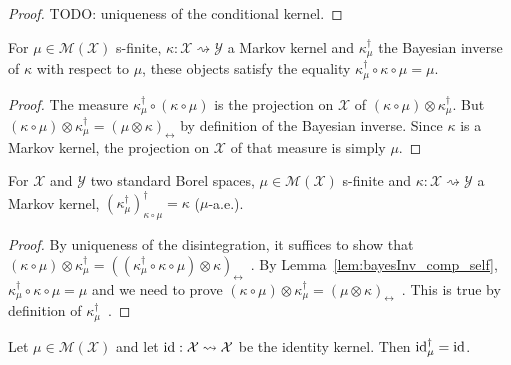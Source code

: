 \begin{proof}\leanok
\uses{}
TODO: uniqueness of the conditional kernel.
\end{proof}


\begin{lemma}
  \label{lem:bayesInv_comp_self}
  \leanok
  For $\mu \in \mathcal M(\mathcal X)$ s-finite, $\kappa : \mathcal X \rightsquigarrow \mathcal Y$ a Markov kernel and $\kappa_\mu^\dagger$ the Bayesian inverse of $\kappa$ with respect to $\mu$, these objects satisfy the equality $\kappa_\mu^\dagger \circ \kappa \circ \mu = \mu$.
\end{lemma}

\begin{proof}\leanok
\uses{}
The measure $\kappa_\mu^\dagger \circ (\kappa \circ \mu)$ is the projection on $\mathcal X$ of $(\kappa \circ \mu) \otimes \kappa_\mu^\dagger$. But $(\kappa \circ \mu) \otimes \kappa_\mu^\dagger = (\mu \otimes \kappa)_\leftrightarrow$ by definition of the Bayesian inverse. Since $\kappa$ is a Markov kernel, the projection on $\mathcal X$ of that measure is simply $\mu$.
\end{proof}


\begin{lemma}
  \label{lem:bayesInv_self}
  \leanok
  For $\mathcal X$ and $\mathcal Y$ two standard Borel spaces, $\mu \in \mathcal M(\mathcal X)$ s-finite and $\kappa : \mathcal X \rightsquigarrow \mathcal Y$ a Markov kernel, $(\kappa_\mu^\dagger)_{\kappa \circ \mu}^\dagger = \kappa$ ($\mu$-a.e.).
\end{lemma}

\begin{proof}\leanok
{}
By uniqueness of the disintegration, it suffices to show that $(\kappa \circ \mu) \otimes \kappa_\mu^\dagger = ((\kappa_\mu^\dagger \circ \kappa \circ \mu) \otimes \kappa)_\leftrightarrow$~.
By Lemma~\ref{lem:bayesInv_comp_self}, $\kappa_\mu^\dagger \circ \kappa \circ \mu = \mu$ and we need to prove $(\kappa \circ \mu) \otimes \kappa_\mu^\dagger = (\mu \otimes \kappa)_\leftrightarrow$~.
This is true by definition of $\kappa_\mu^\dagger$~.
\end{proof}


\begin{lemma}
  \label{lem:bayesInv_id}
  \leanok
  Let $\mu \in \mathcal M (\mathcal X)$ and let $\textup{id} : \mathcal X \rightsquigarrow \mathcal X$ be the identity kernel. Then $\textup{id}_\mu^\dagger = \textup{id}$.
\end{lemma}

